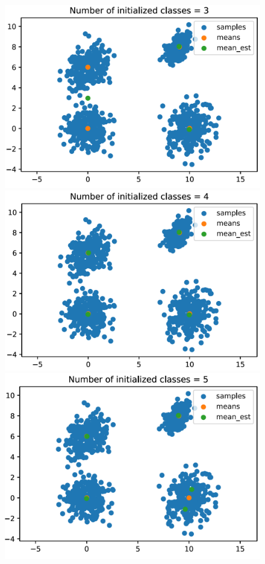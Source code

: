 \documentclass[DIV=12, ngerman, fontsize=12pt, parskip=half]{scrreprt}
\begin{document}
	\begin{figure}[H]
	\begin{center}
		\begin{minipage}[t]{0.4\textwidth}
			\includegraphics[width=\textwidth]{Task3_classes3_png}
		\end{minipage}
		\begin{minipage}[t]{0.4\textwidth}
			\includegraphics[width=\textwidth]{Task3_classes4_png}
		\end{minipage}
		\begin{minipage}[b]{0.4\textwidth}
		\includegraphics[width=\textwidth]{Task3_classes5_png}

\end{minipage}
\end{center}
\end{figure}
\end{document}

